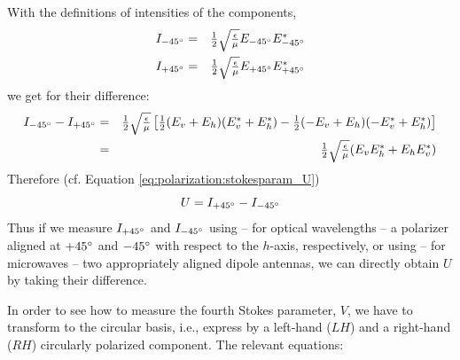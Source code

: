 %
With the definitions of intensities of the components,
\begin{eqnarray}
  \label{eq:polarization:Im45}
  I_{-45^\circ} &=& \textstyle\frac{1}{2}\sqrt{\textstyle{\frac{\epsilon}{\mu}}} E_{-45^\circ} E_{-45^\circ}^\ast\\
  \label{eq:polarization:Ip45}
  I_{+45^\circ} &=& \textstyle\frac{1}{2}\sqrt{\textstyle{\frac{\epsilon}{\mu}}} E_{+45^\circ} E_{+45^\circ}^\ast
\end{eqnarray}
we get for their difference:
\begin{eqnarray}
   I_{-45^\circ} -  I_{+45^\circ}
   &=&
     \textstyle\frac{1}{2}\sqrt{\textstyle{\frac{\epsilon}{\mu}}}\left[
      \textstyle\frac{1}{2} (E_v + E_h) (E_v^\ast + E_h^\ast)
       - \textstyle\frac{1}{2} (-E_v + E_h) (-E_v^\ast + E_h^\ast)\right]\\ \nonumber
   &=&
   \textstyle\frac{1}{2}\sqrt{\textstyle{\frac{\epsilon}{\mu}}}(E_v E_h^\ast + E_h E_v^\ast)
  \label{eq:polarization:Idiff_lin45base}
\end{eqnarray}
Therefore (cf. Equation \ref{eq:polarization:stokesparam_U})
\begin{equation}
  \label{eq:polarization:U_Idiff}
  U =   I_{+45^\circ} -  I_{-45^\circ}
\end{equation}
Thus if we measure $I_{+45^\circ}$ and $I_{-45^\circ}$ using -- for
optical wavelengths -- a polarizer aligned at $+45^\circ$ and
$-45^\circ$ with respect to the $h$-axis, respectively, or using --
for microwaves -- two appropriately aligned dipole antennas, we can
directly obtain $U$ by taking their difference.

In order to see how to measure the fourth Stokes parameter, $V$, we
have to transform to the circular basis, i.e., express  by a
left-hand ($LH$) and a right-hand ($RH$) circularly polarized component. The
relevant equations:

